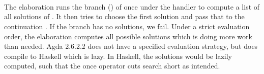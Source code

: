 \begin{code}%
\>[6][@{}l@{\AgdaIndent{1}}]%
\>[8]\AgdaSpace{}%
\AgdaSymbol{:}\AgdaSpace{}%
\AgdaSpace{}%
\AgdaSpace{}%
\AgdaSpace{}%
\AgdaSpace{}%
\AgdaSpace{}%
\AgdaSpace{}%
\AgdaSpace{}%
\AgdaSpace{}%
\<%
\\
%
\>[8]\AgdaSpace{}%
\AgdaSpace{}%
\AgdaSymbol{(}\AgdaSpace{}%
\AgdaOperator{\AgdaInductiveConstructor{,}}\AgdaSpace{}%
\AgdaSpace{}%
\AgdaOperator{\AgdaInductiveConstructor{,}}\AgdaSpace{}%
\AgdaSymbol{)}\AgdaSpace{}%
\AgdaSymbol{=}\AgdaSpace{}%
\<%
\\
\>[8][@{}l@{\AgdaIndent{0}}]%
\>[10]\AgdaSpace{}%
\AgdaSpace{}%
\AgdaSpace{}%
\AgdaSymbol{((}\AgdaSpace{}%
\AgdaSpace{}%
\AgdaSpace{}%
\AgdaSymbol{(}\AgdaSpace{}%
\AgdaSymbol{))}\AgdaSpace{}%
\AgdaSymbol{)}\<%
\\
%
\>[10]\AgdaSpace{}%
\AgdaSpace{}%
\AgdaSpace{}%
\AgdaSymbol{(}\AgdaSpace{}%
\AgdaSymbol{)}\<%
\end{code}
\begin{code}[hide]%
%
\>[10]\AgdaSpace{}%
\AgdaSpace{}%
\AgdaSymbol{\AgdaUnderscore{}}\AgdaSpace{}%
\AgdaSymbol{=}\AgdaSpace{}%
\AgdaSymbol{\AgdaUnderscore{}}\AgdaSpace{}%
\AgdaOperator{\AgdaInductiveConstructor{,}}\AgdaSpace{}%
\AgdaSpace{}%
\AgdaSymbol{(}\AgdaSpace{}%
\AgdaSymbol{)}\<%
\end{code}
The elaboration runs the branch () of \ac{once} under the  handler to compute a list of all solutions of .
It then tries to choose the first solution and pass that to the continuation .
If the branch has no solutions, we fail.
%
Under a strict evaluation order, the elaboration computes all possible solutions which is doing more work than needed.
Agda 2.6.2.2 does not have a specified evaluation strategy, but does compile to Haskell which is lazy.
In Haskell, the solutions would be lazily computed, such that the \ac{once} operator cuts search short as intended.

